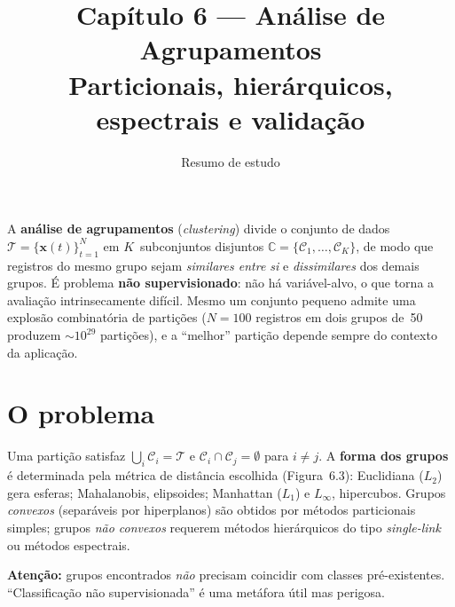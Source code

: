 

\title{\sffamily\bfseries Capítulo 6 — Análise de Agrupamentos\\
       \large Particionais, hierárquicos, espectrais e validação}
\author{Resumo de estudo}
\date{}


\maketitle
\thispagestyle{fancy}

\begin{conceito}
A \textbf{análise de agrupamentos} (\emph{clustering}) divide o
conjunto de dados $\mathcal{T}=\{\mathbf{x}(t)\}_{t=1}^{N}$ em
$K$~subconjuntos disjuntos $\mathbb{C}=\{\mathcal{C}_1,\dots,\mathcal{C}_K\}$,
de modo que registros do mesmo grupo sejam \emph{similares entre si} e
\emph{dissimilares} dos demais grupos. É problema \textbf{não
supervisionado}: não há variável-alvo, o que torna a avaliação
intrinsecamente difícil. Mesmo um conjunto pequeno admite uma
explosão combinatória de partições ($N=100$ registros em dois grupos
de~50 produzem $\sim 10^{29}$ partições), e a ``melhor'' partição
depende sempre do contexto da aplicação.
\end{conceito}

\section{O problema}

Uma partição satisfaz
$\bigcup_{i}\mathcal{C}_i=\mathcal{T}$ e
$\mathcal{C}_i\cap\mathcal{C}_j=\emptyset$ para $i\neq j$. A
\textbf{forma dos grupos} é determinada pela métrica de distância
escolhida (Figura~6.3): Euclidiana ($L_2$) gera esferas; Mahalanobis,
elipsoides; Manhattan ($L_1$) e $L_\infty$, hipercubos. Grupos
\emph{convexos} (separáveis por hiperplanos) são obtidos por métodos
particionais simples; grupos \emph{não convexos} requerem métodos
hierárquicos do tipo \emph{single-link} ou métodos espectrais.

\textbf{Atenção:} grupos encontrados \emph{não} precisam coincidir
com classes pré-existentes. ``Classificação não supervisionada'' é
uma metáfora útil mas perigosa.

